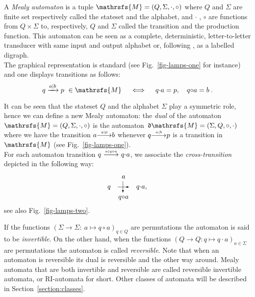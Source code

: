 \documentclass{amsart}
\begin{document}
A \emph{Mealy automaton} is a tuple ${{{\mathrsfs{{M}}}}} = ({{{Q}}},{{{\Sigma}}},{{{\cdot}}},{{{\circ}}})$ where ${{{Q}}}$ and ${{{\Sigma}}}$ are finite set respectively called the stateset and the alphabet, and ${{{\cdot}}}$ , ${{{\circ}}}$ are functions from ${{{Q}}} \times {{{\Sigma}}}$ to, respectively, ${{{Q}}}$ and ${{{\Sigma}}}$ called the transition and the production function. This automaton can be seen as a complete, deterministic, letter-to-letter transducer with same input and output alphabet or, following \cite{DaRo14}, as a labelled digraph.\\
The graphical representation  is standard (see Fig.~\ref{fig-lamps-one} for instance) and one displays transitions as follows:
\begin{equation*}
q \xrightarrow{a\mid b} p \ \in {{{\mathrsfs{{M}}}}} \quad \iff \quad  q{{{\cdot}}} a = p,\quad q{{{\circ}}} a = b\:. 
\end{equation*}

It can be seen that the stateset ${{{Q}}}$ and the alphabet ${{{\Sigma}}}$ play a symmetric role, hence we can define a new Mealy automaton: the \emph{dual} of the automaton~${{{\mathrsfs{{M}}}}}=({{{Q}}},{{{\Sigma}}},{{{\cdot}}},{{{\circ}}})$ is the automaton~${\hbox{$\mathfrak{d}$}}{{{\mathrsfs{{M}}}}}=({{{\Sigma}}},{{{Q}}},{{{\circ}}},{{{\cdot}}})$ where we have the transition $a{\smash{\stackrel{\text{\tiny{${q|p}$}}}{\relbar\joinrel\longrightarrow}}}b$ whenever $q{\smash{\stackrel{\text{\tiny{${a|b}$}}}{\relbar\joinrel\longrightarrow}}}p$ is a transition in ${{{\mathrsfs{{M}}}}}$ (see Fig.~\ref{fig-lamps-one}). \\ 

 For each automaton transition $q~{\smash{\stackrel{\text{\tiny{${a|q{{{\circ}}} a}$}}}{\relbar\joinrel\longrightarrow}}}~q{{{\cdot}}} a$, we associate the \emph{cross-transition} depicted in the following way:
\[\begin{array}{ccc}
		& a            	&    \\
q	& {\tikz[baseline=-.5ex]{\draw[->,>=latex] (0,0) -- (4ex,0); \draw[->,>=latex] (1.8ex,2ex) -- (1.8ex,-2ex);}}    	& q{{{\cdot}}} a, \\
		& q {{{\circ}}}	a 			&            		
\end{array}\]
see also Fig.~\ref{fig-lamps-two}.\\
\medskip

If the functions $\left({{{\Sigma}}} \to {{{\Sigma}}}:~ a \mapsto q {{{\circ}}} a \right)_{q \in {{{Q}}}}$ are permutations the automaton is said to be \emph{invertible}. On the other hand, when the functions $\left({{{Q}}} \to {{{Q}}}: q \mapsto q{{{\cdot}}} a\right)_{a \in {{{\Sigma}}}}$  are permutations the automaton is called \emph{reversible}. Note that when an automaton is reversible its dual is reversible and the other way around. Mealy automata that are both invertible and reversible are called reversible invertible automata, or RI-automata for short. Other classes of automata will be described in Section~\ref{section:classes}.\\
\end{document}
